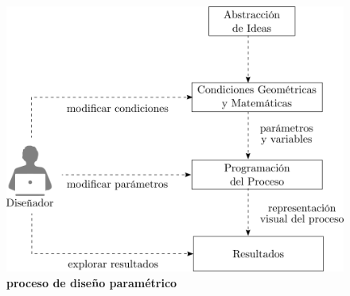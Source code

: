 \begin{figure}[h]
\includegraphics[width=12cm]{Img/CPD/diseno.png}
\centering
\caption{\textbf{\footnotesize{proceso de diseño paramétrico}}}
\label{fig:procesopar}
\end{figure}


